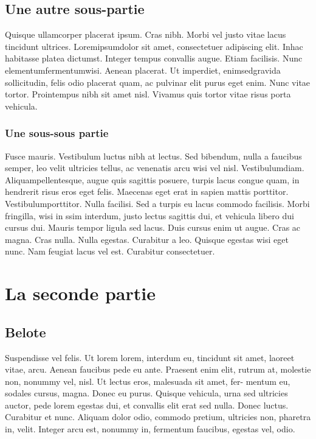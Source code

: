 \documentclass[12pt,twocolumn,twoside]{article}
\begin{document}
\subsection{Une autre sous-partie}
Quisque ullamcorper placerat ipsum. Cras nibh. Morbi vel justo vitae
lacus tincidunt ultrices. Loremipsumdolor sit amet, consectetuer adipiscing
elit. Inhac habitasse platea dictumst. Integer tempus convallis augue. Etiam
facilisis. Nunc elementumfermentumwisi. Aenean placerat. Ut imperdiet,
enimsedgravida sollicitudin, felis odio placerat quam, ac pulvinar elit purus
eget enim. Nunc vitae tortor. Prointempus nibh sit amet nisl. Vivamus quis
tortor vitae risus porta vehicula.

\subsubsection{Une sous-sous partie}
Fusce mauris. Vestibulum luctus nibh at lectus. Sed bibendum, nulla
a faucibus semper, leo velit ultricies tellus, ac venenatis arcu wisi vel nisl.
Vestibulumdiam. Aliquampellentesque, augue quis sagittis posuere, turpis
lacus congue quam, in hendrerit risus eros eget felis. Maecenas eget erat in
sapien mattis porttitor. Vestibulumporttitor. Nulla facilisi. Sed a turpis eu
lacus commodo facilisis. Morbi fringilla, wisi in ssim interdum, justo
lectus sagittis dui, et vehicula libero dui cursus dui. Mauris tempor ligula
sed lacus. Duis cursus enim ut augue. Cras ac magna. Cras nulla. Nulla
egestas. Curabitur a leo. Quisque egestas wisi eget nunc. Nam feugiat lacus
vel est. Curabitur consectetuer.

\section{La seconde partie}
\subsection{Belote}
Suspendisse vel felis. Ut lorem lorem, interdum eu, tincidunt sit amet,
laoreet vitae, arcu. Aenean faucibus pede eu ante. Praesent enim elit, rutrum
at, molestie non, nonummy vel, nisl. Ut lectus eros, malesuada sit amet, fer-
mentum eu, sodales cursus, magna. Donec eu purus. Quisque vehicula, urna
sed ultricies auctor, pede lorem egestas dui, et convallis elit erat sed nulla.
Donec luctus. Curabitur et nunc. Aliquam dolor odio, commodo pretium,
ultricies non, pharetra in, velit. Integer arcu est, nonummy in, fermentum
faucibus, egestas vel, odio.
\end{document}
